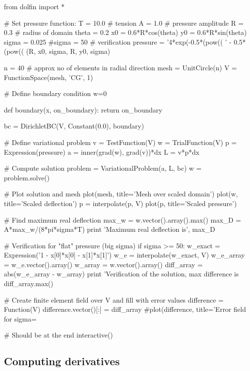 \begin{python}
from dolfin import *

# Set pressure function:
T = 10.0  # tension
A = 1.0   # pressure amplitude
R = 0.3   # radius of domain
theta = 0.2
x0 = 0.6*R*cos(theta)
y0 = 0.6*R*sin(theta)
sigma = 0.025
#sigma = 50  # verification
pressure = '4*exp(-0.5*(pow((%
           '     - 0.5*(pow((%
           (R, x0, sigma, R, y0, sigma)

n = 40   # approx no of elements in radial direction
mesh = UnitCircle(n)
V = FunctionSpace(mesh, 'CG', 1)

# Define boundary condition w=0

def boundary(x, on_boundary):
    return on_boundary

bc = DirichletBC(V, Constant(0.0), boundary)

# Define variational problem
v = TestFunction(V)
w = TrialFunction(V)
p = Expression(pressure)
a = inner(grad(w), grad(v))*dx
L = v*p*dx

# Compute solution
problem = VariationalProblem(a, L, bc)
w = problem.solve()

# Plot solution and mesh
plot(mesh, title='Mesh over scaled domain')
plot(w, title='Scaled deflection')
p = interpolate(p, V)
plot(p, title='Scaled pressure')

# Find maximum real deflection
max_w = w.vector().array().max()
max_D = A*max_w/(8*pi*sigma*T)
print 'Maximum real deflection is', max_D

# Verification for "flat" pressure (big sigma)
if sigma >= 50:
    w_exact = Expression('1 - x[0]*x[0] - x[1]*x[1]')
    w_e = interpolate(w_exact, V)
    w_e_array = w_e.vector().array()
    w_array = w.vector().array()
    diff_array = abs(w_e_array - w_array)
    print 'Verification of the solution, max difference is %
          diff_array.max()

    # Create finite element field over V and fill with error values
    difference = Function(V)
    difference.vector()[:] = diff_array
    #plot(difference, title='Error field for sigma=%

# Should be at the end
interactive()
\end{python}



\subsection{Computing derivatives}
\label{langtangen:poisson:gradu}

